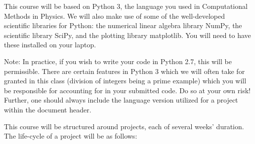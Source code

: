 \documentclass[12pt]{mcplain}
\begin{document}
%


This course will be based on Python 3, the language you used in Computational
Methods in Physics. We will also make use of some of the well-developed
scientific libraries for Python: the numerical linear algebra library NumPy, the
scientific library SciPy, and the plotting library matplotlib. You will need
to have these installed on your laptop.

Note: In practice, if you wish to write your code in Python 2.7, this will be permissible. There are certain features in Python 3 which we will often take for granted in this class (division of integers being a prime example) which you will be responsible for accounting for in your submitted code. Do so at your own risk! Further, one should always include the language version utilized for a project within the document header.


This course will be structured around projects, each of several weeks' duration.
The life-cycle of a project will be as follows:
\end{document}
